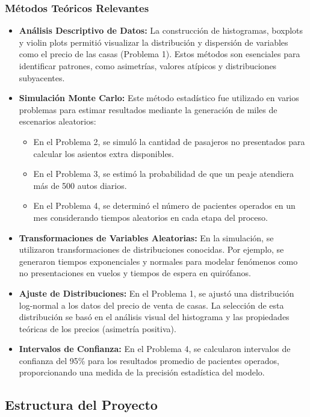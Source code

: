 \documentclass[12pt]{article}
\begin{document}
\subsubsection*{Métodos Teóricos Relevantes}
\begin{itemize}
    \item \textbf{Análisis Descriptivo de Datos:} La construcción de histogramas, boxplots y violin plots permitió visualizar la distribución y dispersión de variables como el precio de las casas (Problema 1). Estos métodos son esenciales para identificar patrones, como asimetrías, valores atípicos y distribuciones subyacentes.
    \item \textbf{Simulación Monte Carlo:} Este método estadístico fue utilizado en varios problemas para estimar resultados mediante la generación de miles de escenarios aleatorios:
    \begin{itemize}
        \item En el Problema 2, se simuló la cantidad de pasajeros no presentados para calcular los asientos extra disponibles.
        \item En el Problema 3, se estimó la probabilidad de que un peaje atendiera más de 500 autos diarios.
        \item En el Problema 4, se determinó el número de pacientes operados en un mes considerando tiempos aleatorios en cada etapa del proceso.
    \end{itemize}
    \item \textbf{Transformaciones de Variables Aleatorias:} En la simulación, se utilizaron transformaciones de distribuciones conocidas. Por ejemplo, se generaron tiempos exponenciales y normales para modelar fenómenos como no presentaciones en vuelos y tiempos de espera en quirófanos.
    \item \textbf{Ajuste de Distribuciones:} En el Problema 1, se ajustó una distribución log-normal a los datos del precio de venta de casas. La selección de esta distribución se basó en el análisis visual del histograma y las propiedades teóricas de los precios (asimetría positiva).
    \item \textbf{Intervalos de Confianza:} En el Problema 4, se calcularon intervalos de confianza del 95\% para los resultados promedio de pacientes operados, proporcionando una medida de la precisión estadística del modelo.
\end{itemize}

\subsection{Estructura del Proyecto}
\end{document}
